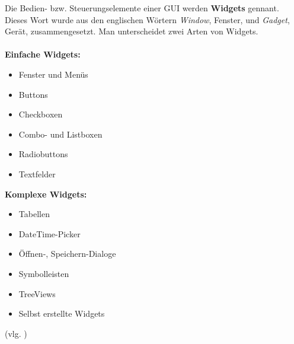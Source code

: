 Die Bedien- bzw. Steuerungselemente einer \ac{GUI} werden \textbf{Widgets} gennant. Dieses Wort wurde aus den englischen Wörtern \textit{Window}, Fenster, und \textit{Gadget}, Gerät, zusammengesetzt. \newpage
Man unterscheidet zwei Arten von Widgets. \\ \\
\textbf{Einfache Widgets:}
\begin{itemize}
\item Fenster und Menüs
\item Buttons
\item Checkboxen
\item Combo- und Listboxen
\item Radiobuttons
\item Textfelder
\end{itemize}
\textbf{Komplexe Widgets:}
\begin{itemize}
\item Tabellen
\item DateTime-Picker
\item Öffnen-, Speichern-Dialoge
\item Symbolleisten
\item TreeViews
\item Selbst erstellte Widgets
\end{itemize}
(vlg. \cite{MF9783})
